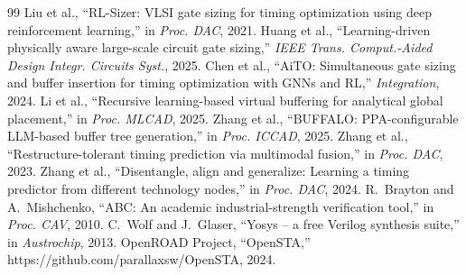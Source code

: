 \documentclass[journal]{IEEEtran}
\begin{document}
\begin{thebibliography}{99}
 Liu et al., ``RL-Sizer: VLSI gate sizing for timing optimization using deep reinforcement learning,'' in \emph{Proc. DAC}, 2021.
 Huang et al., ``Learning-driven physically aware large-scale circuit gate sizing,'' \emph{IEEE Trans. Comput.-Aided Design Integr. Circuits Syst.}, 2025.
 Chen et al., ``AiTO: Simultaneous gate sizing and buffer insertion for timing optimization with GNNs and RL,'' \emph{Integration}, 2024.
 Li et al., ``Recursive learning-based virtual buffering for analytical global placement,'' in \emph{Proc. MLCAD}, 2025.
 Zhang et al., ``BUFFALO: PPA-configurable LLM-based buffer tree generation,'' in \emph{Proc. ICCAD}, 2025.
 Zhang et al., ``Restructure-tolerant timing prediction via multimodal fusion,'' in \emph{Proc. DAC}, 2023.
 Zhang et al., ``Disentangle, align and generalize: Learning a timing predictor from different technology nodes,'' in \emph{Proc. DAC}, 2024.
 R.~Brayton and A.~Mishchenko, ``ABC: An academic industrial-strength verification tool,'' in \emph{Proc. CAV}, 2010.
 C.~Wolf and J.~Glaser, ``Yosys -- a free Verilog synthesis suite,'' in \emph{Austrochip}, 2013.
 OpenROAD Project, ``OpenSTA,'' https://github.com/parallaxsw/OpenSTA, 2024.
\end{thebibliography}
\end{document}
